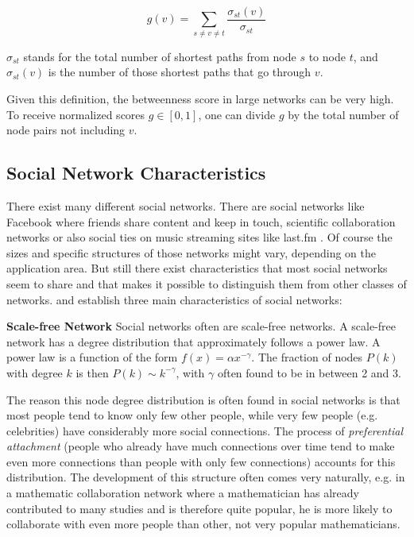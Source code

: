 \begin{equation}
g(v) = \sum_{s \neq v \neq t} \frac{\sigma_{st}(v)}{\sigma_{st}}
\label{eq:betweennesscentrality}
\end{equation}

$\sigma_{st}$ stands for the total number of shortest paths from node $s$ to node $t$, and $\sigma_{st}(v)$ is the number of those shortest paths that go through $v$.

Given this definition, the betweenness score in large networks can be very high. To receive normalized scores $g \in [0,1]$, one can divide $g$ by the total number of node pairs not including $v$.

\subsection{Social Network Characteristics}
\label{sst:socialnetworkcharacteristics} There exist many different social networks. There are social networks like Facebook where friends share content and keep in touch, scientific collaboration networks or also social ties on music streaming sites like last.fm \cite{Lastfm}. Of course the sizes and specific structures of those networks might vary, depending on the application area. But still there exist characteristics that most social networks seem to share and that makes it possible to distinguish them from other classes of networks. \cite{Newman_2003} and \cite{Zaidi_2012} establish three main characteristics of social networks:
\newline

\textbf{Scale-free Network} Social networks often are scale-free networks. A scale-free network has a degree distribution that approximately follows a power law. A power law is a function of the form $f(x) = \alpha x^{-\gamma}$. The fraction of nodes $P(k)$ with degree $k$ is then $P(k) \sim k^{-\gamma}$, with $\gamma$ often found to be in between 2 and 3.

The reason this node degree distribution is often found in social networks is that most people tend to know only few other people, while very few people (e.g. celebrities) have considerably more social connections. The process of \textit{preferential attachment} (people who already have much connections over time tend to make even more connections than people with only few connections) accounts for this distribution. The development of this structure often comes very naturally, e.g. in a mathematic collaboration network where a mathematician has already contributed to many studies and is therefore quite popular, he is more likely to collaborate with even more people than other, not very popular mathematicians.
\newline

